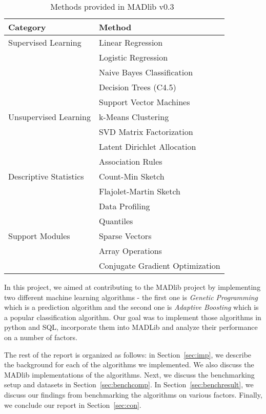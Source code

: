 \begin{table}[!ht]
\centering
\begin{tabular}{|l|l|}
\hline
Category & Method\\
\hline
Supervised Learning & Linear Regression\\
& Logistic Regression\\
& Naive Bayes Classification\\
& Decision Trees (C4.5)\\
& Support Vector Machines\\
\hline
Unsupervised Learning & k-Means Clustering\\
& SVD Matrix Factorization\\
& Latent Dirichlet Allocation\\
& Association Rules\\
\hline
Descriptive Statistics & Count-Min Sketch\\
& Flajolet-Martin Sketch\\
& Data Profiling\\
& Quantiles\\
\hline
Support Modules & Sparse Vectors\\
& Array Operations\\
& Conjugate Gradient Optimization\\
\hline
\end{tabular}
\caption{Methods provided in MADlib v0.3~\cite{madlib12}}
\label{tab:mad}
\end{table}

In this project, we aimed at contributing to the MADlib project by implementing two different machine learning algorithms - the first one is {\itshape Genetic Programming} which is a prediction algorithm and the second one is {\itshape Adaptive Boosting} which is a popular classification algorithm. Our goal was to implement those algorithms in python and SQL, incorporate them into MADLib and analyze their performance on a number of factors.

The rest of the report is organized as follows: in Section~\ref{sec:imp}, we describe the background for each of the algorithms we implemented. We also discuss the MADlib implementations of the algorithms. Next, we discuss the benchmarking setup and datasets in Section~\ref{sec:benchcomp}. In Section~\ref{sec:benchresult}, we discuss our findings from benchmarking the algorithms on various factors. Finally, we conclude our report in Section~\ref{sec:con}.
